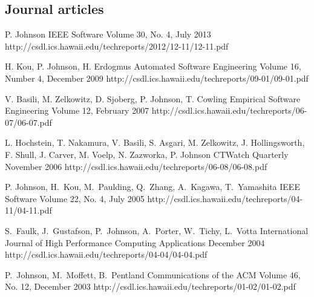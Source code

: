 \documentclass[11pt,letterpaper,sans]{moderncv} %
\begin{document}
\subsection{Journal articles}

          {P. Johnson}
          {IEEE Software}
          {Volume 30, No. 4, July 2013}
          {http://csdl.ics.hawaii.edu/techreports/2012/12-11/12-11.pdf}

          {H. Kou, P. Johnson, H. Erdogmus}
          {Automated Software Engineering}
          {Volume 16, Number 4, December 2009}
          {http://csdl.ics.hawaii.edu/techreports/09-01/09-01.pdf}

          {V. Basili, M. Zelkowitz, D. Sjoberg, P. Johnson, T. Cowling}
          {Empirical Software Engineering}
          {Volume 12, February 2007}
          {http://csdl.ics.hawaii.edu/techreports/06-07/06-07.pdf}

          {L. Hochstein, T. Nakamura, V. Basili, S. Asgari, M. Zelkowitz, J. Hollingsworth, F. Shull, J. Carver, M. Voelp, N. Zazworka, P. Johnson}
          {CTWatch Quarterly}
          {November 2006}
          {http://csdl.ics.hawaii.edu/techreports/06-08/06-08.pdf}

          {P. Johnson, H.~Kou, M.~Paulding, Q.~Zhang, A.~Kagawa, T.~Yamashita}
          {IEEE Software}
          {Volume 22, No. 4, July 2005}
          {http://csdl.ics.hawaii.edu/techreports/04-11/04-11.pdf}

          {S.~Faulk, J.~Gustafson, P.~Johnson, A.~Porter, W.~Tichy, L.~Votta}
          {International Journal of High Performance Computing Applications}
          {December 2004}
          {http://csdl.ics.hawaii.edu/techreports/04-04/04-04.pdf}

          {P.~Johnson, M.~Moffett, B.~Pentland}
          {Communications of the ACM}
          {Volume 46, No. 12, December 2003}
          {http://csdl.ics.hawaii.edu/techreports/01-02/01-02.pdf}
\end{document}
